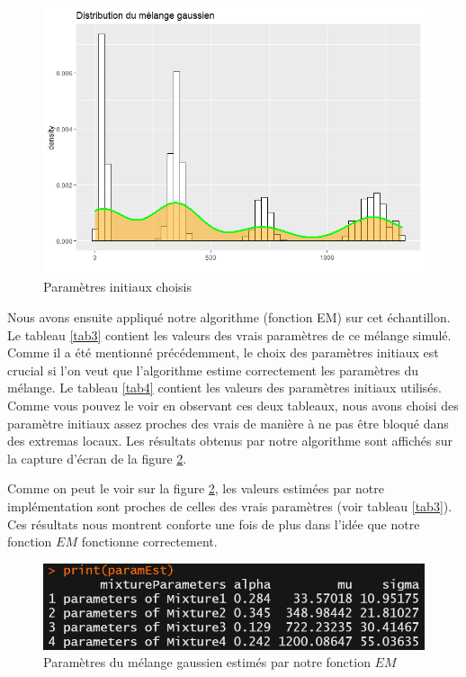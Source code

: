 \documentclass[a4paper,french,10pt]{article}
\begin{document}
\begin{figure}[htp] 
	\centering
	\includegraphics[scale=0.45]{images/dens_sim2.png}
	\caption{Paramètres initiaux choisis}
	\label{density_sim2}
\end{figure}

Nous avons ensuite appliqué notre algorithme (fonction EM) sur cet échantillon. Le tableau \ref{tab3} contient les valeurs des vrais paramètres de ce mélange simulé. Comme il a été mentionné précédemment, le choix des paramètres initiaux est crucial si l'on veut que l'algorithme estime correctement les paramètres du mélange. Le tableau \ref{tab4} contient les valeurs des paramètres initiaux utilisés. Comme vous pouvez le voir en observant ces deux tableaux, nous avons choisi des paramètre initiaux assez proches des vrais de manière à ne pas être bloqué dans des extremas locaux. Les résultats obtenus par notre algorithme sont affichés sur la capture d'écran de la figure \ref{res_sim2}.

Comme on peut le voir sur la figure \ref{res_sim2}, les valeurs estimées par notre implémentation sont proches de celles des vrais paramètres (voir tableau \ref{tab3}). Ces résultats nous montrent conforte une fois de plus dans l'idée que notre fonction $EM$ fonctionne correctement.

\begin{figure}[htp] 
	\centering
	\includegraphics[scale=0.7]{images/res_sim2.png}
	\caption{Paramètres du mélange gaussien estimés par notre fonction $EM$}
	\label{res_sim2}
\end{figure}
\end{document}
